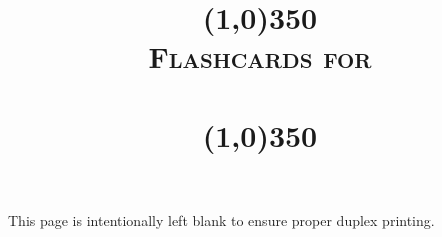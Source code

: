 \documentclass[a4_a7,frame]{flashcards}
\title{\vspace{3cm}\line(1,0){350}\\\textsc{Flashcards for\\\textsc{\MyLecture}\\\line(1,0){350}}}
\begin{document}
	\maketitle
	\vspace*{\fill}
	\begin{versionhistory}
	\end{versionhistory}
	\newpage
	\restoregeometry
	\vspace*{\fill}
	\centering This page is intentionally left blank to ensure proper duplex printing.\par
	\vspace{\fill}
	\newpage

	
	
	
	
	
	
\end{document}
